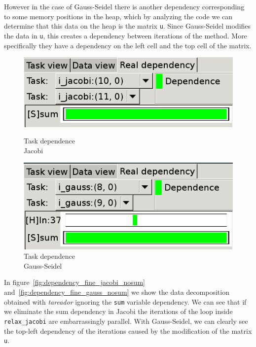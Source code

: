 However in the case of Gauss-Seidel there is another dependency corresponding to some
memory positions in the heap, which by analyzing the code we can determine that this
data on the heap is the matrix \texttt{u}. Since Gauss-Seidel modifies the data in
\texttt{u}, this creates a dependency between iterations of the method. More specifically
they have a dependency on the left cell and the top cell of the matrix.

\begin{figure}[H]
    \begin{minipage}{0.5\textwidth}
        \centering
        \includegraphics[width=0.9\linewidth]{dependence_jacobi}
        \caption{Task dependence \\ Jacobi}%
        \label{fig:dependence_jacobi}
    \end{minipage}
    \begin{minipage}{0.5\textwidth}
        \centering
        \includegraphics[width=0.9\linewidth]{dependence_gauss}
        \caption{Task dependence \\ Gauss-Seidel}%
        \label{fig:dependence_gauss}
    \end{minipage}
\end{figure}

In figure~\ref{fig:dependency_fine_jacobi_nosum} and~\ref{fig:dependency_fine_gauss_nosum}
we show the data decomposition obtained with \emph{tareador} ignoring the \texttt{sum} variable
dependency.
We can see that if we eliminate the sum dependency in Jacobi the iterations of the
loop inside \texttt{relax\_jacobi} are embarrassingly parallel. With Gauss-Seidel,
we can clearly see the top-left dependency of the iterations caused by the modification
of the matrix \texttt{u}.

